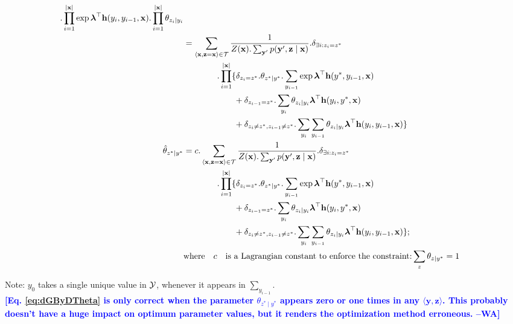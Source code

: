 \documentclass[11pt,onecolumn]{article}
\newcommand{\wacomment}[1]{\textcolor{blue}{\bf\small [#1 --WA]}}
\begin{document}
\begin{align}
      . \prod_{i=1}^{|\mathbf{x}|} \exp \boldsymbol{\lambda}^\top \mathbf{h}(y_i, y_{i-1}, \mathbf{x})
      . \prod_{i=1}^{|\mathbf{x}|} \theta_{z_i \mid y_i} \\
&= 
  \sum_{\langle\mathbf{x},\mathbf{z}=\mathbf{x}\rangle \in \cal{T}} 
    \frac{1}{Z(\mathbf{x}).\sum_{\mathbf{y'}} p(\mathbf{y'}, \mathbf{z} \mid \mathbf{x})}
    . \delta_{\exists i: z_i=z^*} \nonumber \\
   &\qquad\qquad. \prod_{i=1}^{|\mathbf{x}|} \{ 
      \delta_{z_i=z^*}
      . \theta_{z^*\mid y^*} 
      . \sum_{y_{i-1}} \exp \boldsymbol{\lambda}^\top \mathbf{h}(y^*, y_{i-1}, \mathbf{x}) \nonumber \\
   &\qquad\qquad\qquad+
      \delta_{z_{i-1}=z^*}
      . \sum_{y_i} \theta_{z_i\mid y_i}  \boldsymbol{\lambda}^\top \mathbf{h}(y_i, y^*, \mathbf{x}) \nonumber \\
   &\qquad\qquad\qquad+ 
      \delta_{z_i \neq z^*, z_{i-1} \neq z^*}
      . \sum_{y_i} \sum_{y_{i-1}} \theta_{z_i\mid y_i} \boldsymbol{\lambda}^\top \mathbf{h}(y_i, y_{i-1}, \mathbf{x})
    \}  \label{eq:dGByDTheta}\\
\hat{\theta}_{z^*\mid y^*} &= 
  c
  . \sum_{\langle\mathbf{x},\mathbf{z}=\mathbf{x}\rangle \in \cal{T}} 
    \frac{1}{Z(\mathbf{x}).\sum_{\mathbf{y'}} p(\mathbf{y'}, \mathbf{z} \mid \mathbf{x})}
    . \delta_{\exists i: z_i=z^*} \nonumber \\
   &\qquad\qquad. \prod_{i=1}^{|\mathbf{x}|} \{ 
      \delta_{z_i=z^*}
      . \theta_{z^*\mid y^*} 
      . \sum_{y_{i-1}} \exp \boldsymbol{\lambda}^\top \mathbf{h}(y^*, y_{i-1}, \mathbf{x}) \nonumber \\
   &\qquad\qquad\qquad+
      \delta_{z_{i-1}=z^*}
      . \sum_{y_i} \theta_{z_i\mid y_i}  \boldsymbol{\lambda}^\top \mathbf{h}(y_i, y^*, \mathbf{x}) \nonumber \\
   &\qquad\qquad\qquad+ 
      \delta_{z_i \neq z^*, z_{i-1} \neq z^*}
      . \sum_{y_i} \sum_{y_{i-1}} \theta_{z_i\mid y_i} \boldsymbol{\lambda}^\top \mathbf{h}(y_i, y_{i-1}, \mathbf{x})
    \}; \\
&\text{where} \quad c \quad \text{is a Lagrangian constant to enforce the constraint:} \sum_z \theta_{z|y^*} = 1 \nonumber 
\end{align}

Note: $y_0$ takes a single unique value in $\cal{Y}$, whenever it appears in $\sum_{y_{i-1}}$.\\

\wacomment{Eq. \ref{eq:dGByDTheta} is only correct when the parameter $\theta_{z^*\mid y^*}$ appears zero or one times in any $\langle \mathbf{y},\mathbf{z} \rangle$. This probably doesn't have a huge impact on optimum parameter values, but it renders the optimization method erroneous.}
\end{document}
